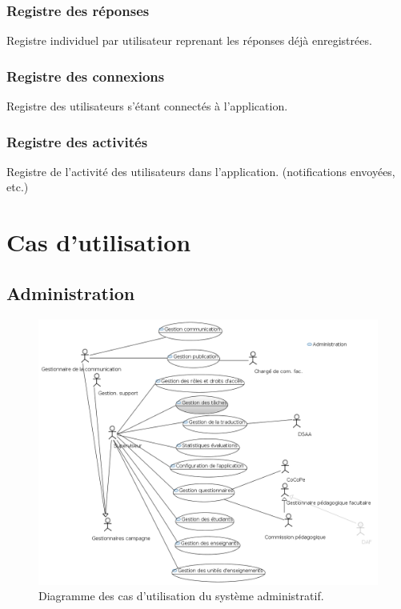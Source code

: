 \documentclass[a4paper,11pt]{report}
\begin{document}
\subsection{Registre des réponses}
Registre individuel par utilisateur reprenant les réponses déjà enregistrées.

\subsection{Registre des connexions}
Registre des utilisateurs s'étant connectés à l'application.

\subsection{Registre des activités}
Registre de l'activité des utilisateurs dans l'application. (notifications envoyées, etc.)












\chapter{Cas d'utilisation}

\section{Administration}

\begin{figure}[ht]
\includegraphics[width=\linewidth]{workspace/evalens-usecases/administration.png}
\caption{Diagramme des cas d'utilisation du système administratif.}
\label{fig:usecase-admin}
\end{figure}
\end{document}
